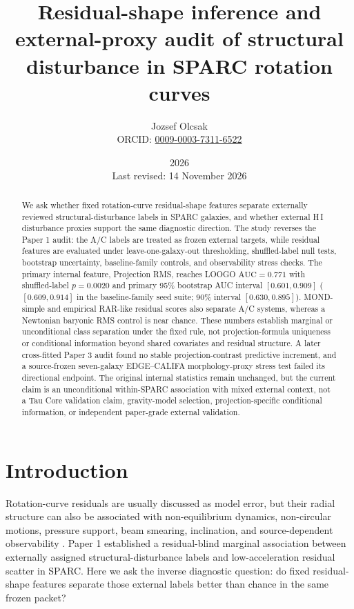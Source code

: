 \documentclass[11pt]{article}
\title{Residual-shape inference and external-proxy audit of structural disturbance in SPARC rotation curves}
\author{Jozsef Olcsak\\{\small ORCID: \href{https://orcid.org/0009-0003-7311-6522}{0009-0003-7311-6522}}}
\date{2026\\Last revised: 14 November 2026}
\begin{document}
\maketitle

\begin{abstract}
We ask whether fixed rotation-curve residual-shape features separate externally reviewed structural-disturbance labels in SPARC galaxies, and whether external H\,I disturbance proxies support the same diagnostic direction. The study reverses the Paper 1 audit: the A/C labels are treated as frozen external targets, while residual features are evaluated under leave-one-galaxy-out thresholding, shuffled-label null tests, bootstrap uncertainty, baseline-family controls, and observability stress checks. The primary internal feature, Projection RMS, reaches LOOGO $\mathrm{AUC} = 0.771$ with shuffled-label $p = 0.0020$ and primary 95\% bootstrap AUC interval $[0.601, 0.909]$ ($[0.609, 0.914]$ in the baseline-family seed suite; 90\% interval $[0.630, 0.895]$). MOND-simple and empirical RAR-like residual scores also separate A/C systems, whereas a Newtonian baryonic RMS control is near chance. These numbers establish marginal or unconditional class separation under the fixed rule, not projection-formula uniqueness or conditional information beyond shared covariates and residual structure. A later cross-fitted Paper 3 audit found no stable projection-contrast predictive increment, and a source-frozen seven-galaxy EDGE--CALIFA morphology-proxy stress test failed its directional endpoint. The original internal statistics remain unchanged, but the current claim is an unconditional within-SPARC association with mixed external context, not a Tau Core validation claim, gravity-model selection, projection-specific conditional information, or independent paper-grade external validation.
\end{abstract}

\section{Introduction}

Rotation-curve residuals are usually discussed as model error, but their radial structure can also be associated with non-equilibrium dynamics, non-circular motions, pressure support, beam smearing, inclination, and source-dependent observability \cite{Trachternach2008THINGS,Oman2019NonCircular}. Paper 1 established a residual-blind marginal association between externally assigned structural-disturbance labels and low-acceleration residual scatter in SPARC. Here we ask the inverse diagnostic question: do fixed residual-shape features separate those external labels better than chance in the same frozen packet?
\end{document}
